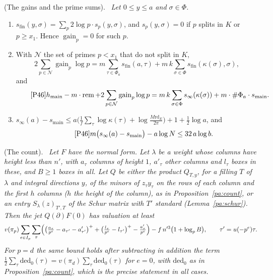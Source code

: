 \documentclass[10pt]{amsart}
\theoremstyle{definition}
\theoremstyle{remark}
\providecommand{\auPa}{\Phi_a}
\providecommand{\auPl}{\Phi}
\providecommand{\augain}{\operatorname{gain}}
\providecommand{\auhmain}{h_{\mathrm{main}}}
\providecommand{\aurd}{\mathrm{rd}_E}
\providecommand{\aurem}{\operatorname{rem}}
\providecommand{\ausfin}{s_{\mathrm{fin}}}
\providecommand{\ausinf}{s_\infty}
\providecommand{\ausmain}{s_{\mathrm{main}}}
\newenvironment{quotedthm}[2]{\par\medskip\noindent\begingroup
  \textbf{#1}#2.\ \itshape\ignorespaces}{\endgroup\par\medskip}
\begin{document}
\begin{quotedthm}{\cite[Lemma~14.9]{P46}}{ (The gains and the prime sums)}
Let $0\le y\le a$ and $\sigma\in\auPl$.
\begin{enumerate}
\item[(a)] $\ausfin(y,\sigma)=\sum_p2\log p\cdot s_p(y,\sigma)$, and $s_p(y,\sigma)=0$ if $p$
splits in $K$ or $p\ge x_1$. Hence $\augain_p=0$ for such $p$.
\item[(b)] With $\mathcal N$ the set of primes $p<x_1$ that do not split in $K$,
\[
2\sum_{p\in\mathcal N}\augain_p\log p=m\sum_{\tau\in\auPa}\ausfin(a,\tau)+m\,k\sum_{\sigma\in\auPl}
\ausfin(\kappa(\sigma),\sigma),
\]
and
\begin{equation*}\tag*{{\cite[(42)]{P46}}}
\auhmain-m\cdot\aurem+2\sum_{p\in\mathcal N}\augain_p\log p=m\,k\sum_{\sigma\in\auPl}\ausinf
(\kappa(\sigma))+m\cdot\#\auPa\cdot\ausmain .
\end{equation*}
\item[(c)] $\ausinf(a)-\ausmain\le a\bigl(\tfrac1f\sum_\tau\log\kappa(\tau)+\log\frac{M\aurd}
{2\pi}\bigr)+1+\tfrac12\log a$, and
\begin{equation*}\tag*{{\cite[(43)]{P46}}}
m\bigl(\ausinf(a)-\ausmain\bigr)-a\log N\le32\,a\log b .
\end{equation*}
\end{enumerate}
\end{quotedthm}

\begin{quotedthm}{\cite[Proposition~14.10]{P46}}{ (The count)}
Let $F$ have the normal form. Let $\lambda$ be a weight whose columns have height less than $n'$, with $a_\tau$ columns of
height $1$, $a'_\tau$ other columns and $l_\tau$ boxes in these, and $B\ge1$ boxes in all. Let $Q$ be either
the product $Q_{T,y}$, for a filling $T$ of $\lambda$ and integral directions $y$, of the minors of
$z_\tau y_\tau$ on the rows of each column and the first $h$ columns ($h$ the height of the column),
as in Proposition~\ref{pa:count}, or an entry $S_\lambda(z)_{T',T}$ of the Schur matrix with $T'$
standard (Lemma~\ref{pa:schur}). Then the jet
$Q(\partial)F(0)$ has valuation at least
\[
v(\pi_p)\sum_{e\in I_p}\sum_{\tau}\Bigl(\bigl(\tfrac{a_\tau}{p^e}-a_{\tau'}-a'_{\tau'}\bigr)^+
+\bigl(\tfrac{l_\tau}{p^e}-l_{\tau'}\bigr)^+-\tfrac{a'_\tau}{p^e}\Bigr)-f\,n'^3\bigl(1+\log_p
B\bigr),\qquad\tau'=u(-p^e)\tau.
\]
For $p=d$ the same bound holds after subtracting in
addition the term $\tfrac12\sum_\tau\mathrm{ded}_0(\tau)=v(\pi_d)\sum_\tau\mathrm{ded}_0(\tau)$ for $e=0$, with
$\mathrm{ded}_0$ as in Proposition~\ref{pa:count}, which is the precise statement in all cases.
\end{quotedthm}
\end{document}

